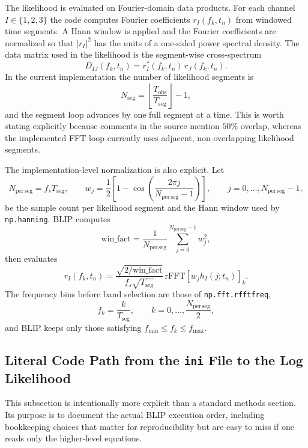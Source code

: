 \documentclass[11pt]{article}
\begin{document}
The likelihood is evaluated on Fourier-domain data products. For each channel $I\in\{1,2,3\}$ the code computes Fourier coefficients $r_I(f_k,t_n)$ from windowed time segments. A Hann window is applied and the Fourier coefficients are normalized so that $|r_I|^2$ has the units of a one-sided power spectral density. The data matrix used in the likelihood is the segment-wise cross-spectrum
\begin{equation}
D_{IJ}(f_k,t_n)=r_I^{\ast}(f_k,t_n)\,r_J(f_k,t_n).
\end{equation}
In the current implementation the number of likelihood segments is
\begin{equation}
N_{\mathrm{seg}}=\left\lfloor \frac{T_{\mathrm{obs}}}{T_{\mathrm{seg}}}\right\rfloor-1,
\end{equation}
and the segment loop advances by one full segment at a time. This is worth stating explicitly because comments in the source mention $50\%$ overlap, whereas the implemented FFT loop currently uses adjacent, non-overlapping likelihood segments.

The implementation-level normalization is also explicit. Let
\begin{equation}
N_{\mathrm{per\,seg}} = f_s T_{\mathrm{seg}},
\qquad
w_j=\frac{1}{2}\left[1-\cos\!\left(\frac{2\pi j}{N_{\mathrm{per\,seg}}-1}\right)\right],
\qquad
j=0,\dots,N_{\mathrm{per\,seg}}-1,
\end{equation}
be the sample count per likelihood segment and the Hann window used by \texttt{np.hanning}. BLIP computes
\begin{equation}
\mathrm{win\_fact}=\frac{1}{N_{\mathrm{per\,seg}}}\sum_{j=0}^{N_{\mathrm{per\,seg}}-1} w_j^2,
\end{equation}
then evaluates
\begin{equation}
r_I(f_k,t_n)
=\frac{\sqrt{2/\mathrm{win\_fact}}}{f_s\sqrt{T_{\mathrm{seg}}}}\,
\mathrm{rFFT}\!\left[w_j h_I(j;t_n)\right]_k .
\end{equation}
The frequency bins before band selection are those of \texttt{np.fft.rfftfreq},
\begin{equation}
f_k=\frac{k}{T_{\mathrm{seg}}},
\qquad
k=0,\dots,\frac{N_{\mathrm{per\,seg}}}{2},
\end{equation}
and BLIP keeps only those satisfying $f_{\min}\le f_k\le f_{\max}$.

\subsection{Literal Code Path from the \texttt{ini} File to the Log Likelihood}
This subsection is intentionally more explicit than a standard methods section. Its purpose is to document the actual BLIP execution order, including bookkeeping choices that matter for reproducibility but are easy to miss if one reads only the higher-level equations.
\end{document}
